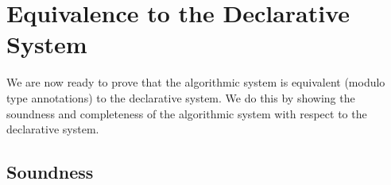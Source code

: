 
\section{Equivalence to the Declarative System}
\label{algorithmic:equivalence}

We are now ready to prove that the algorithmic system is equivalent (modulo type annotations) to the declarative system. We do this by showing the soundness and completeness of the algorithmic system with respect to the declarative system.


\subsection{Soundness}

